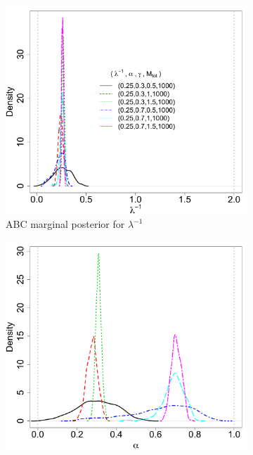 \documentclass[12pt]{article}
\begin{document}
\begin{figure}[htbp]
   \centering
\begin{subfigure}{0.48\textwidth}
\centering
\includegraphics[width = \textwidth]{figures/marg_k.pdf} 
\caption{ABC marginal posterior for $\lambda^{-1}$}\label{subfig:marg_k}
\end{subfigure}
\begin{subfigure}{0.48\textwidth}
\centering
\includegraphics[width = \textwidth]{figures/marg_alpha.pdf} 

\end{subfigure}
\end{figure}
\end{document}
